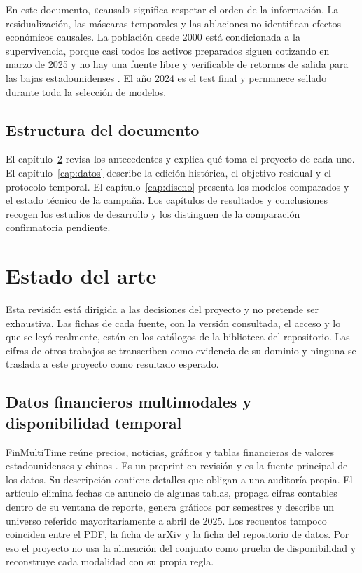 \documentclass[11pt,a4paper]{report}
\begin{document}
En este documento, «causal» significa respetar el orden de la información. La
residualización, las máscaras temporales y las ablaciones no identifican
efectos económicos causales. La población desde 2000 está condicionada a la
supervivencia, porque casi todos los activos preparados siguen cotizando en
marzo de 2025 y no hay una fuente libre y verificable de retornos de salida
para las bajas estadounidenses \parencite{shumway1997delisting}. El año 2024
es el test final y permanece sellado durante toda la selección de modelos.

\section{Estructura del documento}
El capítulo~\ref{cap:estado} revisa los antecedentes y explica qué toma el
proyecto de cada uno. El capítulo~\ref{cap:datos} describe la edición
histórica, el objetivo residual y el protocolo temporal. El
capítulo~\ref{cap:diseno} presenta los modelos comparados y el estado técnico
de la campaña. Los capítulos de resultados y conclusiones recogen los estudios
de desarrollo y los distinguen de la comparación confirmatoria pendiente.

\chapter{Estado del arte}
\label{cap:estado}
Esta revisión está dirigida a las decisiones del proyecto y no pretende ser
exhaustiva. Las fichas de cada fuente, con la versión consultada, el acceso y
lo que se leyó realmente, están en los catálogos de la biblioteca del
repositorio. Las cifras de otros trabajos se transcriben como evidencia de su
dominio y ninguna se traslada a este proyecto como resultado esperado.

\section{Datos financieros multimodales y disponibilidad temporal}
FinMultiTime reúne precios, noticias, gráficos y tablas financieras de
valores estadounidenses y chinos \parencite{xu2025finmultitime}. Es un
preprint en revisión y es la fuente principal de los datos. Su descripción
contiene detalles que obligan a una auditoría propia. El artículo elimina
fechas de anuncio de algunas tablas, propaga cifras contables dentro de su
ventana de reporte, genera gráficos por semestres y describe un universo
referido mayoritariamente a abril de 2025. Los recuentos tampoco coinciden
entre el PDF, la ficha de arXiv y la ficha del repositorio de datos. Por eso el
proyecto no usa la alineación del conjunto como prueba de disponibilidad y
reconstruye cada modalidad con su propia regla.
\end{document}
